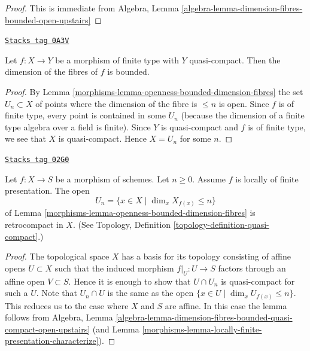 \begin{proof}
This is immediate from
Algebra,
Lemma \ref{algebra-lemma-dimension-fibres-bounded-open-upstairs}
\end{proof}

\begin{lemma}
\label{morphisms-lemma-morphism-finite-type-bounded-dimension}
\href{https://stacks.math.columbia.edu/tag/0A3V}{\texttt{Stacks tag 0A3V}}

Let $f : X \to Y$ be a morphism of finite type with $Y$ quasi-compact.
Then the dimension of the fibres of $f$ is bounded.
\end{lemma}

\begin{proof}

By Lemma \ref{morphisms-lemma-openness-bounded-dimension-fibres}
the set $U_n \subset X$ of points where the dimension of the fibre
is $\leq n$ is open. Since $f$ is of finite type, every point is
contained in some $U_n$ (because the dimension of a finite
type algebra over a field is finite). Since $Y$ is quasi-compact and $f$ is of
finite type, we see that $X$ is quasi-compact. Hence $X = U_n$ for
some $n$.
\end{proof}

\begin{lemma}
\label{morphisms-lemma-openness-bounded-dimension-fibres-finite-presentation}
\href{https://stacks.math.columbia.edu/tag/02G0}{\texttt{Stacks tag 02G0}}

Let $f : X \to S$ be a morphism of schemes.
Let $n \geq 0$. Assume $f$ is locally of finite presentation.
The open
$$
U_n = \{x \in X \mid \dim_x X_{f(x)} \leq n\}
$$
of Lemma \ref{morphisms-lemma-openness-bounded-dimension-fibres} is retrocompact
in $X$. (See Topology, Definition \ref{topology-definition-quasi-compact}.)
\end{lemma}

\begin{proof}

The topological space $X$ has a basis for its topology consisting of
affine opens $U \subset X$ such that the induced morphism
$f|_U : U \to S$ factors through an affine open $V \subset S$. Hence
it is enough to show that $U \cap U_n$ is quasi-compact for such a $U$.
Note that $U_n \cap U$ is the same as the open
$\{x \in U \mid \dim_x U_{f(x)} \leq n\}$. This reduces us to the case
where $X$ and $S$ are affine. In this case the lemma follows from
Algebra,
Lemma \ref{algebra-lemma-dimension-fibres-bounded-quasi-compact-open-upstairs}
(and Lemma \ref{morphisms-lemma-locally-finite-presentation-characterize}).
\end{proof}

